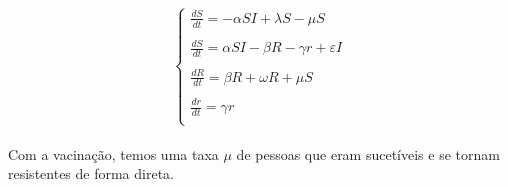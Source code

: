 \documentclass[a4paper]{article}
\begin{document}
\begin{enumerate}
\begin{equation}
\left\{\begin{array}{l}
\frac{dS}{dt} = -\alpha SI + \lambda S -\mu S\\
\\
\frac{dS}{dt} = \alpha SI - \beta R - \gamma r + \varepsilon I\\
\\
\frac{dR}{dt} = \beta R + \omega R + \mu S \\
\\
\frac{dr}{dt} = \gamma r \\
\end{array}
\end{equation}
\\
Com a vacina\c{c}\~ao, temos uma taxa $\mu$ de pessoas que eram sucet\'iveis e se tornam resistentes de forma direta.
\\


\end{enumerate}
\end{document}
